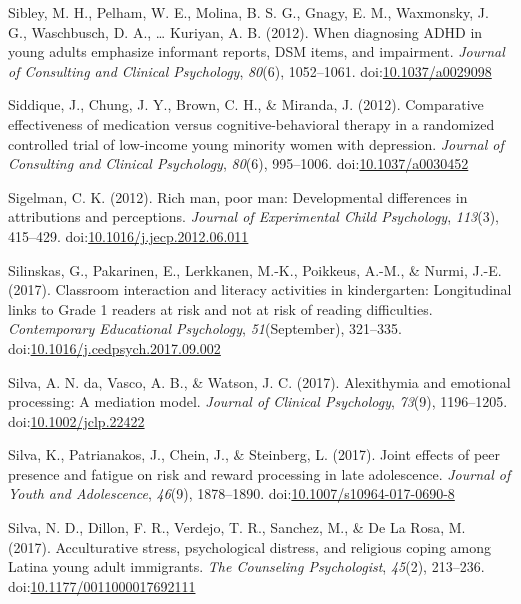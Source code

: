 \documentclass[english,man]{apa6}
\begin{document}
\hypertarget{ref-Sibley2012}{}
Sibley, M. H., Pelham, W. E., Molina, B. S. G., Gnagy, E. M., Waxmonsky,
J. G., Waschbusch, D. A., \ldots{} Kuriyan, A. B. (2012). When
diagnosing ADHD in young adults emphasize informant reports, DSM items,
and impairment. \emph{Journal of Consulting and Clinical Psychology},
\emph{80}(6), 1052--1061.
doi:\href{https://doi.org/10.1037/a0029098}{10.1037/a0029098}

\hypertarget{ref-Siddique2012}{}
Siddique, J., Chung, J. Y., Brown, C. H., \& Miranda, J. (2012).
Comparative effectiveness of medication versus cognitive-behavioral
therapy in a randomized controlled trial of low-income young minority
women with depression. \emph{Journal of Consulting and Clinical
Psychology}, \emph{80}(6), 995--1006.
doi:\href{https://doi.org/10.1037/a0030452}{10.1037/a0030452}

\hypertarget{ref-Sigelman2012}{}
Sigelman, C. K. (2012). Rich man, poor man: Developmental differences in
attributions and perceptions. \emph{Journal of Experimental Child
Psychology}, \emph{113}(3), 415--429.
doi:\href{https://doi.org/10.1016/j.jecp.2012.06.011}{10.1016/j.jecp.2012.06.011}

\hypertarget{ref-Silinskas2017}{}
Silinskas, G., Pakarinen, E., Lerkkanen, M.-K., Poikkeus, A.-M., \&
Nurmi, J.-E. (2017). Classroom interaction and literacy activities in
kindergarten: Longitudinal links to Grade 1 readers at risk and not at
risk of reading difficulties. \emph{Contemporary Educational
Psychology}, \emph{51}(September), 321--335.
doi:\href{https://doi.org/10.1016/j.cedpsych.2017.09.002}{10.1016/j.cedpsych.2017.09.002}

\hypertarget{ref-DaSilva2017}{}
Silva, A. N. da, Vasco, A. B., \& Watson, J. C. (2017). Alexithymia and
emotional processing: A mediation model. \emph{Journal of Clinical
Psychology}, \emph{73}(9), 1196--1205.
doi:\href{https://doi.org/10.1002/jclp.22422}{10.1002/jclp.22422}

\hypertarget{ref-Silva2017b}{}
Silva, K., Patrianakos, J., Chein, J., \& Steinberg, L. (2017). Joint
effects of peer presence and fatigue on risk and reward processing in
late adolescence. \emph{Journal of Youth and Adolescence}, \emph{46}(9),
1878--1890.
doi:\href{https://doi.org/10.1007/s10964-017-0690-8}{10.1007/s10964-017-0690-8}

\hypertarget{ref-Silva2017a}{}
Silva, N. D., Dillon, F. R., Verdejo, T. R., Sanchez, M., \& De La Rosa,
M. (2017). Acculturative stress, psychological distress, and religious
coping among Latina young adult immigrants. \emph{The Counseling
Psychologist}, \emph{45}(2), 213--236.
doi:\href{https://doi.org/10.1177/0011000017692111}{10.1177/0011000017692111}
\end{document}
